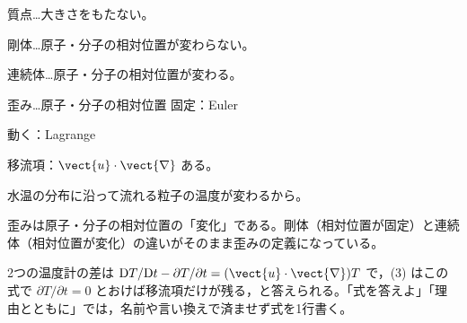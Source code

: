 質点…大きさをもたない。

剛体…原子・分子の相対位置が変わらない。

連続体…原子・分子の相対位置が変わる。

歪み…原子・分子の相対位置
固定：Euler

動く：Lagrange

移流項：$\vect{u}\cdot\vect{\nabla}$
ある。

水温の分布に沿って流れる粒子の温度が変わるから。
\item 歪みは原子・分子の相対位置の「変化」である。剛体（相対位置が固定）と連続体（相対位置が変化）の違いがそのまま歪みの定義になっている。
\item 2つの温度計の差は $\mathrm{D}T/\mathrm{D}t-\partial T/\partial t=(\vect{u}\cdot\vect{\nabla})T$ で，(3) はこの式で $\partial T/\partial t=0$ とおけば移流項だけが残る，と答えられる。「式を答えよ」「理由とともに」では，名前や言い換えで済ませず式を1行書く。
